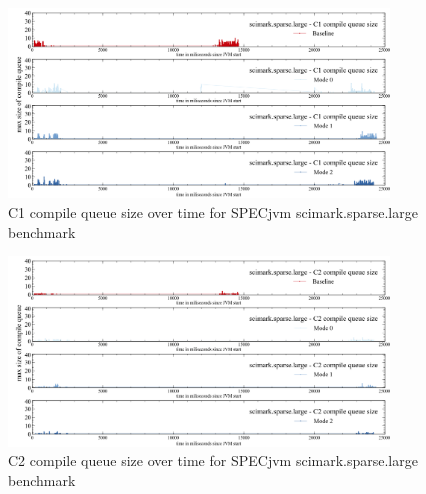 \begin{figure}[ht]
  \begin{center}
    \centering
    \includegraphics[width=0.9\textwidth]{figures/spec_queue_scirmarksparselarge_separate_c1.png}
    \caption{C1 compile queue size over time for SPECjvm scimark.sparse.large benchmark}
    \label{f:spec_queue_scirmarksparselarge_separate_c1}
  \end{center}
\end{figure}
\begin{figure}[ht]
  \begin{center}
    \centering
    \includegraphics[width=0.9\textwidth]{figures/spec_queue_scirmarksparselarge_separate_c2.png}
    \caption{C2 compile queue size over time for SPECjvm scimark.sparse.large benchmark}
    \label{f:spec_queue_scirmarksparselarge_separate_c2}
  \end{center}
\end{figure}
